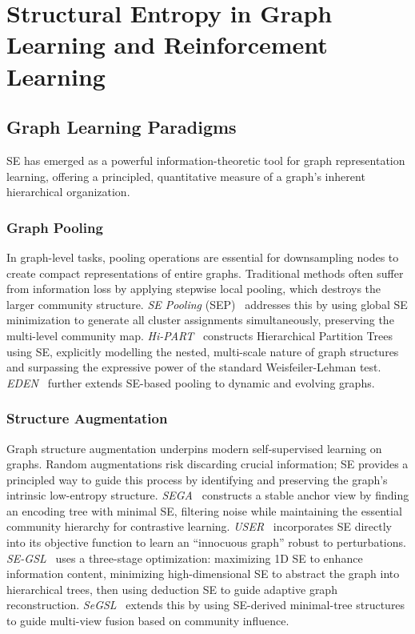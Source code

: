 \section{Structural Entropy in Graph Learning and Reinforcement Learning}
\label{sec:learning}

\subsection{Graph Learning Paradigms}
\label{subsec:graph-learning}

SE has emerged as a powerful information-theoretic tool for graph
representation learning, offering a principled, quantitative measure of a
graph's inherent hierarchical organization.

\subsubsection{Graph Pooling}

In graph-level tasks, pooling operations are essential for downsampling nodes
to create compact representations of entire graphs.
Traditional methods often suffer from information loss by applying stepwise
local pooling, which destroys the larger community structure.
\emph{SE Pooling} (SEP)~\cite{wu2022pooling} addresses this by using global
SE minimization to generate all cluster assignments simultaneously, preserving
the multi-level community map.
\emph{Hi-PART}~\cite{wxb2024hi-part} constructs Hierarchical Partition Trees
using SE, explicitly modelling the nested, multi-scale nature of graph
structures and surpassing the expressive power of the standard
Weisfeiler-Lehman test.
\emph{EDEN}~\cite{li2025eden} further extends SE-based pooling to dynamic
and evolving graphs.

\subsubsection{Structure Augmentation}

Graph structure augmentation underpins modern self-supervised learning on
graphs.
Random augmentations risk discarding crucial information; SE provides a
principled way to guide this process by identifying and preserving the graph's
intrinsic low-entropy structure.
\emph{SEGA}~\cite{wu2023sega} constructs a stable anchor view by finding an
encoding tree with minimal SE, filtering noise while maintaining the essential
community hierarchy for contrastive learning.
\emph{USER}~\cite{wang2023user} incorporates SE directly into its objective
function to learn an ``innocuous graph'' robust to perturbations.
\emph{SE-GSL}~\cite{zou2023segsl} uses a three-stage optimization: maximizing
1D SE to enhance information content, minimizing high-dimensional SE to
abstract the graph into hierarchical trees, then using deduction SE to guide
adaptive graph reconstruction.
\emph{SeGSL}~\cite{duan2024structuralGSL} extends this by using SE-derived
minimal-tree structures to guide multi-view fusion based on community
influence.

